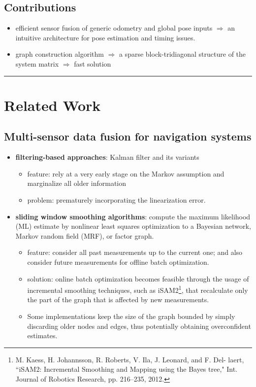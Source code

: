 \documentclass[letterpaper,11pt]{article}
\begin{document}
\subsection{Contributions}

\begin{itemize}
	\item efficient sensor fusion of generic odometry and global pose inputs $\Rightarrow$ an intuitive architecture for pose estimation and timing issues.
	\item graph construction algorithm $\Rightarrow$ a sparse block-tridiagonal structure of the system matrix $\Rightarrow$ fast solution
\end{itemize}

\begin{center}\rule{\textwidth}{1pt}\end{center}
\section{Related Work}

\subsection{Multi-sensor data fusion for navigation systems}

\begin{itemize}
	\item \textbf{filtering-based approaches}: Kalman filter and its variants
	\begin{itemize}
		\item feature: rely at a very early stage on the Markov assumption and marginalize all older information
		\item problem: prematurely incorporating the linearization error.
	\end{itemize}
	\item \textbf{sliding window smoothing algorithms}: compute the maximum likelihood (ML) estimate by nonlinear least squares optimization to a Bayesian network, Markov random field (MRF), or factor graph.
	\begin{itemize}
		\item feature: consider all past measurements up to the current one; and also consider future measurements for offline batch optimization.
		\item solution: online batch optimization becomes feasible through the usage of incremental smoothing techniques, such as iSAM2\footnote{M. Kaess, H. Johannsson, R. Roberts, V. Ila, J. Leonard, and F. Del- laert, ``iSAM2: Incremental Smoothing and Mapping using the Bayes tree," Int. Journal of Robotics Research, pp. 216–235, 2012.}, that recalculate only the part of the graph that is affected by new measurements.
		\item Some implementations keep the size of the graph bounded by simply discarding older nodes and edges, thus potentially obtaining overconfident estimates.
	\end{itemize}
\end{itemize}
\end{document}
